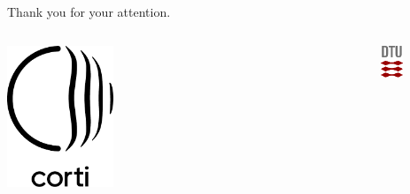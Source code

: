 
{

\begin{frame}
    \frametitle{}
    \begin{center}
        \Huge Thank you for your attention.
    \end{center}
    \begin{columns}
        \begin{column}{0.5\textwidth}
            \begin{center}
                \hspace{12em}
                \includegraphics[width=0.3\textwidth]{figures/Orb_logotype_Vertical_black.pdf}
            \end{center}
        \end{column}
        \begin{column}{0.5\textwidth}
            \begin{center}
                \hspace{-12em}
                \includegraphics[width=0.3\textwidth]{dtu_logo/tex_dtu_logo.pdf}
            \end{center}
        \end{column}
    \end{columns}
\end{frame}

}
